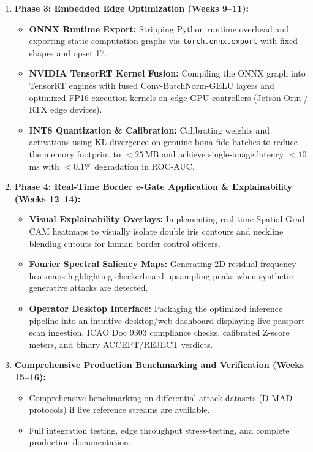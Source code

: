 \documentclass[11pt,a4paper]{article}
\begin{document}
\begin{enumerate}[leftmargin=*]
    \item \textbf{Phase 3: Embedded Edge Optimization (Weeks 9--11):}
    \begin{itemize}
        \item \textbf{ONNX Runtime Export:} Stripping Python runtime overhead and exporting static computation graphs via \texttt{torch.onnx.export} with fixed shapes and opset 17.
        \item \textbf{NVIDIA TensorRT Kernel Fusion:} Compiling the ONNX graph into TensorRT engines with fused Conv-BatchNorm-GELU layers and optimized FP16 execution kernels on edge GPU controllers (Jetson Orin / RTX edge devices).
        \item \textbf{INT8 Quantization & Calibration:} Calibrating weights and activations using KL-divergence on genuine bona fide batches to reduce the memory footprint to $<25$\,MB and achieve single-image latency $<10$\,ms with $<0.1\%$ degradation in ROC-AUC.
    \end{itemize}
    \item \textbf{Phase 4: Real-Time Border e-Gate Application & Explainability (Weeks 12--14):}
    \begin{itemize}
        \item \textbf{Visual Explainability Overlays:} Implementing real-time Spatial Grad-CAM heatmaps to visually isolate double iris contours and neckline blending cutouts for human border control officers.
        \item \textbf{Fourier Spectral Saliency Maps:} Generating 2D residual frequency heatmaps highlighting checkerboard upsampling peaks when synthetic generative attacks are detected.
        \item \textbf{Operator Desktop Interface:} Packaging the optimized inference pipeline into an intuitive desktop/web dashboard displaying live passport scan ingestion, ICAO Doc 9303 compliance checks, calibrated Z-score meters, and binary ACCEPT/REJECT verdicts.
    \end{itemize}
    \item \textbf{Comprehensive Production Benchmarking and Verification (Weeks 15--16):}
    \begin{itemize}
        \item Comprehensive benchmarking on differential attack datasets (D-MAD protocols) if live reference streams are available.
        \item Full integration testing, edge throughput stress-testing, and complete production documentation.
    \end{itemize}
\end{enumerate}
\end{document}
